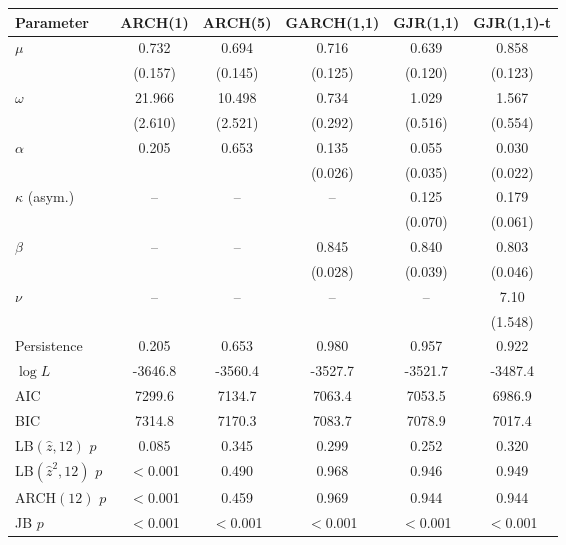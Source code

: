 \begin{tabular}{lccccc}\toprule
Parameter & ARCH(1) & ARCH(5) & GARCH(1,1) & GJR(1,1) & GJR(1,1)-t \\\midrule
$\mu$ & 0.732 & 0.694 & 0.716 & 0.639 & 0.858 \\
 & (0.157) & (0.145) & (0.125) & (0.120) & (0.123) \\
$\omega$ & 21.966 & 10.498 & 0.734 & 1.029 & 1.567 \\
 & (2.610) & (2.521) & (0.292) & (0.516) & (0.554) \\
$\alpha$ & 0.205 & 0.653 & 0.135 & 0.055 & 0.030 \\
 &  &  & (0.026) & (0.035) & (0.022) \\
$\kappa$ (asym.) & -- & -- & -- & 0.125 & 0.179 \\
 &  &  &  & (0.070) & (0.061) \\
$\beta$ & -- & -- & 0.845 & 0.840 & 0.803 \\
 &  &  & (0.028) & (0.039) & (0.046) \\
$\nu$ & -- & -- & -- & -- & 7.10 \\
 &  &  &  &  & (1.548) \\
\midrule
Persistence & 0.205 & 0.653 & 0.980 & 0.957 & 0.922 \\
$\log L$ & -3646.8 & -3560.4 & -3527.7 & -3521.7 & -3487.4 \\
AIC & 7299.6 & 7134.7 & 7063.4 & 7053.5 & 6986.9 \\
BIC & 7314.8 & 7170.3 & 7083.7 & 7078.9 & 7017.4 \\
\midrule
LB$(\hat z,12)$ $p$ & 0.085 & 0.345 & 0.299 & 0.252 & 0.320 \\
LB$(\hat z^2,12)$ $p$ & $<$0.001 & 0.490 & 0.968 & 0.946 & 0.949 \\
ARCH$(12)$ $p$ & $<$0.001 & 0.459 & 0.969 & 0.944 & 0.944 \\
JB $p$ & $<$0.001 & $<$0.001 & $<$0.001 & $<$0.001 & $<$0.001 \\
\bottomrule\end{tabular}
